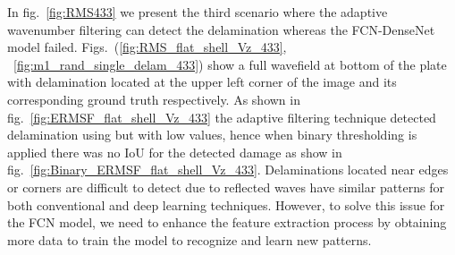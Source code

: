 	In fig.~\ref{fig:RMS433} we present the third scenario where the adaptive wavenumber filtering can detect the delamination whereas the FCN-DenseNet model failed.
	Figs.~(\ref{fig:RMS_flat_shell_Vz_433}, ~\ref{fig:m1_rand_single_delam_433}) show a full wavefield at bottom of the plate with delamination located at the upper left corner of the image and its corresponding ground truth respectively.
	As shown in fig.~\ref{fig:ERMSF_flat_shell_Vz_433} the adaptive filtering technique detected delamination using but with low values, hence when binary thresholding is applied there was no IoU for the detected damage as show in fig.~\ref{fig:Binary_ERMSF_flat_shell_Vz_433}. 
	Delaminations located near edges or corners are difficult to detect due to reflected waves have similar patterns for both conventional and deep learning techniques. 
	However, to solve this issue for the FCN model, we need to enhance the feature extraction process by obtaining more data to train the model to recognize and learn new patterns.	
